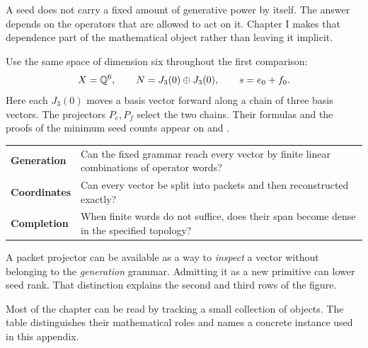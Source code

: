 
A seed does not carry a fixed amount of generative power by itself. The answer depends on the operators that are allowed to act on it. Chapter I makes that dependence part of the mathematical object rather than leaving it implicit.

Use the same space of dimension six throughout the first comparison:
\[
X=\mathbb Q^6,\qquad N=J_3(0)\oplus J_3(0),\qquad
s=e_0+f_0.
\]
Here each $J_3(0)$ moves a basis vector forward along a chain of three basis vectors. The projectors $P_e,P_f$ select the two chains. Their formulas and the proofs of the minimum seed counts appear on  and .


\begin{tabularx}{\linewidth}{@{}p{.18\linewidth}Y@{}}
\textbf{Generation} & Can the fixed grammar reach every vector by finite linear combinations of operator words?\\[4pt]
\textbf{Coordinates} & Can every vector be split into packets and then reconstructed exactly?\\[4pt]
\textbf{Completion} & When finite words do not suffice, does their span become dense in the specified topology?
\end{tabularx}

A packet projector can be available as a way to \emph{inspect} a vector without belonging to the \emph{generation} grammar. Admitting it as a new primitive can lower seed rank. That distinction explains the second and third rows of the figure.


Most of the chapter can be read by tracking a small collection of objects. The table distinguishes their mathematical roles and names a concrete instance used in this appendix.

